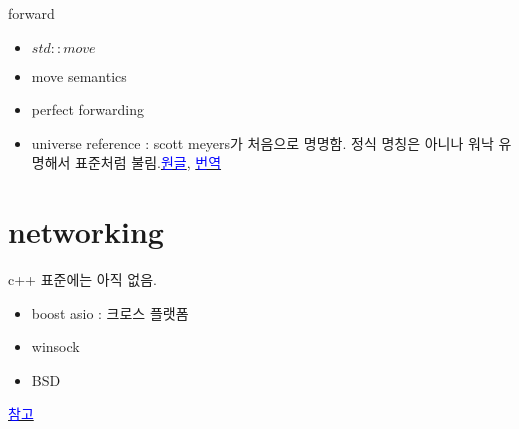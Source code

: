 \documentclass[10pt]{beamer}
\begin{document}
\begin{frame}{forward}
    \begin{itemize}
        \item $std::move$
        \item move semantics
        \item perfect forwarding
        \item universe reference : scott meyers가 처음으로 명명함. 정식 명칭은 아니나 워낙 유명해서 표준처럼 불림.\href{https://isocpp.org/blog/2012/11/universal-references-in-c11-scott-meyers}{\textcolor{blue}{원글}}, \href{http://egloos.zum.com/sweeper/v/3149089}{\textcolor{blue}{번역}}
        
    \end{itemize}
\end{frame}





\section{networking}


\begin{frame}{}
    c++ 표준에는 아직 없음.
    \begin{itemize}
        \item boost asio : 크로스 플랫폼
        \item winsock
        \item BSD
    \end{itemize}
    
    \href{https://jacking.tistory.com/1267}{\textcolor{blue}{참고}}
    
\end{frame}


    









\end{document}
